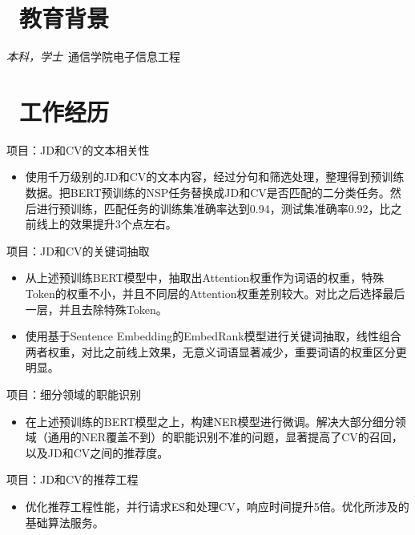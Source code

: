\documentclass{resume}
\begin{document}


 
\section{\faGraduationCap\  教育背景}
\textit{本科，学士}\ 通信学院电子信息工程

\section{\faUsers\ 工作经历}
项目：JD和CV的文本相关性
\begin{itemize}
  \item 使用千万级别的JD和CV的文本内容，经过分句和筛选处理，整理得到预训练数据。把BERT预训练的NSP任务替换成JD和CV是否匹配的二分类任务。然后进行预训练，匹配任务的训练集准确率达到0.94，测试集准确率0.92，比之前线上的效果提升3个点左右。
\end{itemize}

项目：JD和CV的关键词抽取
\begin{itemize}
  \item 从上述预训练BERT模型中，抽取出Attention权重作为词语的权重，特殊Token的权重不小，并且不同层的Attention权重差别较大。对比之后选择最后一层，并且去除特殊Token。
  \item 使用基于Sentence Embedding的EmbedRank模型进行关键词抽取，线性组合两者权重，对比之前线上效果，无意义词语显著减少，重要词语的权重区分更明显。
\end{itemize}

项目：细分领域的职能识别
\begin{itemize}
  \item 在上述预训练的BERT模型之上，构建NER模型进行微调。解决大部分细分领域（通用的NER覆盖不到）的职能识别不准的问题，显著提高了CV的召回，以及JD和CV之间的推荐度。
\end{itemize}

项目：JD和CV的推荐工程
\begin{itemize}
  \item 优化推荐工程性能，并行请求ES和处理CV，响应时间提升5倍。优化所涉及的基础算法服务。
\end{itemize}
\end{document}
